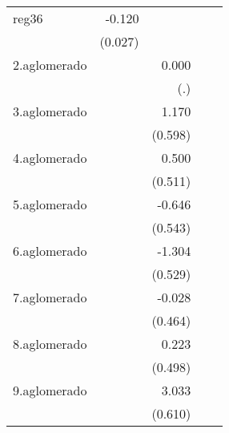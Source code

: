 {\begin{longtable}{l*{4}{D{.}{.}{-1}}}
\addlinespace
reg36       &      -0.120\sym{***}&                     &                     &                     \\
            &     (0.027)         &                     &                     &                     \\
\addlinespace
2.aglomerado&                     &       0.000         &                     &                     \\
            &                     &         (.)         &                     &                     \\
\addlinespace
3.aglomerado&                     &       1.170         &                     &                     \\
            &                     &     (0.598)         &                     &                     \\
\addlinespace
4.aglomerado&                     &       0.500         &                     &                     \\
            &                     &     (0.511)         &                     &                     \\
\addlinespace
5.aglomerado&                     &      -0.646         &                     &                     \\
            &                     &     (0.543)         &                     &                     \\
\addlinespace
6.aglomerado&                     &      -1.304\sym{*}  &                     &                     \\
            &                     &     (0.529)         &                     &                     \\
\addlinespace
7.aglomerado&                     &      -0.028         &                     &                     \\
            &                     &     (0.464)         &                     &                     \\
\addlinespace
8.aglomerado&                     &       0.223         &                     &                     \\
            &                     &     (0.498)         &                     &                     \\
\addlinespace
9.aglomerado&                     &       3.033\sym{***}&                     &                     \\
            &                     &     (0.610)         &                     &                     \\

\end{longtable}}
